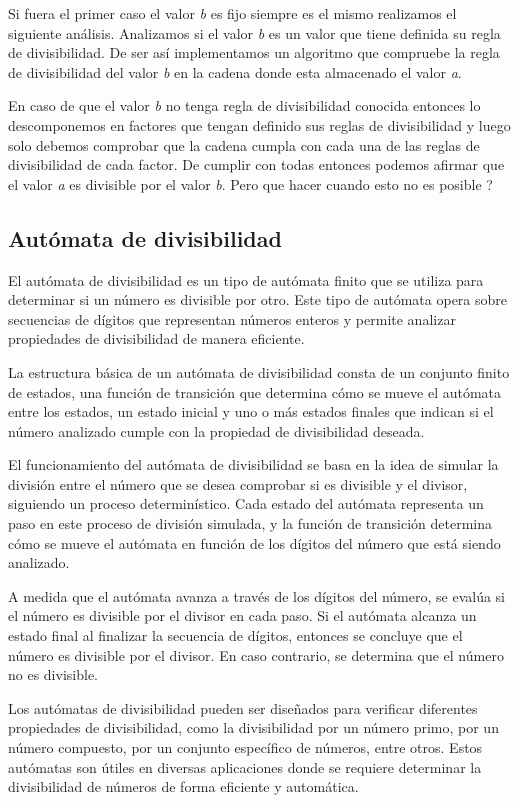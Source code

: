 Si fuera el primer caso el valor {\em b} es fijo siempre es el mismo realizamos el siguiente análisis. Analizamos si el valor {\em b} es un valor que tiene definida su regla de divisibilidad. De ser así implementamos un algoritmo que compruebe la regla de divisibilidad del valor {\em b} en la cadena donde esta almacenado el valor {\em a}. 

En caso de que el valor {\em b} no tenga regla de divisibilidad conocida entonces lo descomponemos en factores que tengan definido sus reglas de divisibilidad y luego solo debemos comprobar que la cadena cumpla con cada una de las reglas de divisibilidad de cada factor. De cumplir con todas entonces podemos afirmar que el valor {\em a} es divisible por el valor {\em b}. Pero que hacer cuando esto no es posible ? 

\subsection{Autómata de divisibilidad}

El autómata de divisibilidad es un tipo de autómata finito que se utiliza para determinar si un número es divisible por otro. Este tipo de autómata opera sobre secuencias de dígitos que representan números enteros y permite analizar propiedades de divisibilidad de manera eficiente.

La estructura básica de un autómata de divisibilidad consta de un conjunto finito de estados, una función de transición que determina cómo se mueve el autómata entre los estados, un estado inicial y uno o más estados finales que indican si el número analizado cumple con la propiedad de divisibilidad deseada.

El funcionamiento del autómata de divisibilidad se basa en la idea de simular la división entre el número que se desea comprobar si es divisible y el divisor, siguiendo un proceso determinístico. Cada estado del autómata representa un paso en este proceso de división simulada, y la función de transición determina cómo se mueve el autómata en función de los dígitos del número que está siendo analizado.

A medida que el autómata avanza a través de los dígitos del número, se evalúa si el número es divisible por el divisor en cada paso. Si el autómata alcanza un estado final al finalizar la secuencia de dígitos, entonces se concluye que el número es divisible por el divisor. En caso contrario, se determina que el número no es divisible.

Los autómatas de divisibilidad pueden ser diseñados para verificar diferentes propiedades de divisibilidad, como la divisibilidad por un número primo, por un número compuesto, por un conjunto específico de números, entre otros. Estos autómatas son útiles en diversas aplicaciones donde se requiere determinar la divisibilidad de números de forma eficiente y automática.

